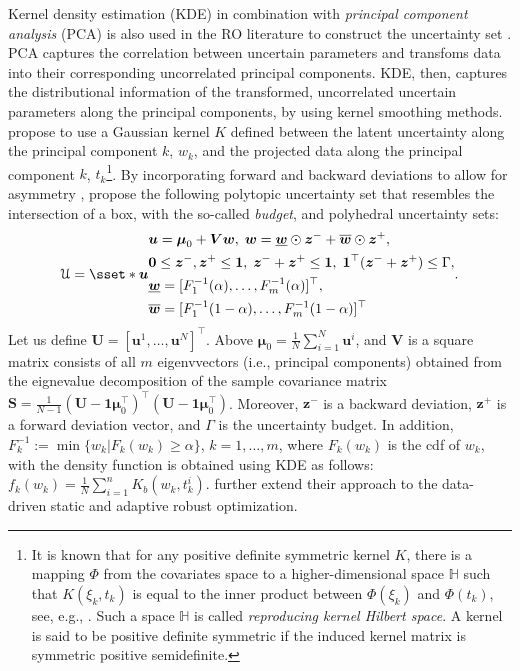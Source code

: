 \documentclass[final,onefignum,onetabnum]{class}
\newcommand{\bs}[1]{\boldsymbol{#1}} %
\newcommand{\Bs}[1]{\mathbb{#1}} %
\newcommand{\Cs}[1]{\mathcal{#1}} %
\newcommand{\ul}[1]{\underline{#1}}
\newcommand{\ol}[1]{\overline{#1}}
\begin{document}
Kernel density estimation (KDE) \cite{devroye1985} in combination with {\it principal component analysis} (PCA) is also  used in the RO literature to construct the uncertainty set \citep{ning2018kernel}. PCA captures the correlation between uncertain parameters and transfoms data into their corresponding uncorrelated principal components. KDE, then, captures the distributional information of the transformed, uncorrelated uncertain parameters along the principal components,   by using kernel smoothing methods. 
\citet{ning2018kernel} propose to use a Gaussian kernel $K$ defined between the latent uncertainty along the  principal component $k$,  $w_{k}$, and the projected data along the principal component $k$, $t_{k}$\footnote{It is known that for any positive definite symmetric kernel $K$, there is a mapping $\Phi$ from the covariates space  to a higher-dimensional space $\Bs{H}$ such that   $K(\xi_{k},t_{k})$ is equal to the inner product  between $\Phi(\xi_{k})$ and $\Phi(t_{k})$, see, e.g., \citet[Theorem~5.2]{mohri2018foundations}. Such a space $\Bs{H}$ is called {\it reproducing kernel Hilbert space}. A kernel is said to be positive definite symmetric if the induced kernel matrix is symmetric positive semidefinite.}.
By incorporating forward and backward deviations to allow for asymmetry \cite{chen2007robust}, \citet{ning2018kernel} propose the following polytopic uncertainty set that resembles the intersection of a box, with the so-called {\it budget}, and polyhedral uncertainty sets:
\begin{equation*}
	\Cs{U}=\sset*{\bs{u}}{ 
		\begin{aligned}  
			& \bs{u}=\bs{\mu}_{0}+ \bs{V} \bs{w}, \; \bs{w}= \bs{\ul{w}} \odot \bs{z}^{-} +  \bs{\ol{w}} \odot \bs{z}^{+}, \\
			& \bs{0} \le \bs{z}^{-}, \bs{z}^{+} \le \bs{1}, \; \bs{z}^{-}+\bs{z}^{+} \le \bs{1}, \; \bs{1}^{\top} (\bs{z}^{-}+\bs{z}^{+}) \le \Gamma, \\
			& \ul{\bs{w}}= [F^{-1}_{1}(\alpha), \ldots, F^{-1}_{m}(\alpha)]^{\top}, \\
			& \ol{\bs{w}}= [F^{-1}_{1}(1-\alpha), \ldots, F^{-1}_{m}(1-\alpha)]^{\top}
		\end{aligned}  
	}.
\end{equation*} 
Let us define $\bs{U}=[\bs{u}^{1}, \ldots, \bs{u}^{N}]^{\top}$. Above $\bs{\mu}_{0}=\frac{1}{N} \sum_{i=1}^{N} \bs{u}^{i}$, and $\bs{V}$ is a square matrix consists of all  $m$ eigenvvectors (i.e., principal components) obtained from the eignevalue decomposition of the sample covariance matrix $\bs{S}=\frac{1}{N-1} (\bs{U}-\bs{1}\bs{\mu}_{0}^{\top})^{\top}(\bs{U}-\bs{1}\bs{\mu}_{0}^{\top}) $. Moreover, $\bs{z}^{-}$ is a backward deviation,  $\bs{z}^{+}$ is a forward deviation vector, and $\Gamma$ is the uncertainty budget. In addition, $F^{-1}_{k}:=\min\{w_{k}|F_{k}(w_{k}) \ge \alpha\}$, $k=1, \ldots, m$, where $F_{k}(w_{k})$ is the cdf of $w_{k}$, with the density function is obtained using KDE as follows: $f_{k}(w_{k})=\frac{1}{N} \sum_{i=1}^{n} K_{b}(w_{k}, t_{k}^{i})$. \citet{ning2018kernel} further extend their approach to the data-driven static and adaptive robust optimization. 
\end{document}
